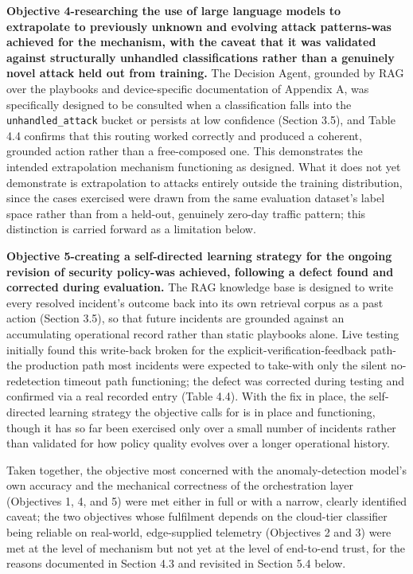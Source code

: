 \textbf{Objective 4-researching the use of large language models to extrapolate to previously unknown and evolving attack patterns-was achieved for the mechanism, with the caveat that it was validated against structurally unhandled classifications rather than a genuinely novel attack held out from training.} The Decision Agent, grounded by RAG over the playbooks and device-specific documentation of Appendix A, was specifically designed to be consulted when a classification falls into the \texttt{unhandled\_attack} bucket or persists at low confidence (Section 3.5), and Table 4.4 confirms that this routing worked correctly and produced a coherent, grounded action rather than a free-composed one. This demonstrates the intended extrapolation mechanism functioning as designed. What it does not yet demonstrate is extrapolation to attacks entirely outside the training distribution, since the cases exercised were drawn from the same evaluation dataset's label space rather than from a held-out, genuinely zero-day traffic pattern; this distinction is carried forward as a limitation below.

\textbf{Objective 5-creating a self-directed learning strategy for the ongoing revision of security policy-was achieved, following a defect found and corrected during evaluation.} The RAG knowledge base is designed to write every resolved incident's outcome back into its own retrieval corpus as a past action (Section 3.5), so that future incidents are grounded against an accumulating operational record rather than static playbooks alone. Live testing initially found this write-back broken for the explicit-verification-feedback path-the production path most incidents were expected to take-with only the silent no-redetection timeout path functioning; the defect was corrected during testing and confirmed via a real recorded entry (Table 4.4). With the fix in place, the self-directed learning strategy the objective calls for is in place and functioning, though it has so far been exercised only over a small number of incidents rather than validated for how policy quality evolves over a longer operational history.

Taken together, the objective most concerned with the anomaly-detection model's own accuracy and the mechanical correctness of the orchestration layer (Objectives 1, 4, and 5) were met either in full or with a narrow, clearly identified caveat; the two objectives whose fulfilment depends on the cloud-tier classifier being reliable on real-world, edge-supplied telemetry (Objectives 2 and 3) were met at the level of mechanism but not yet at the level of end-to-end trust, for the reasons documented in Section 4.3 and revisited in Section 5.4 below.

